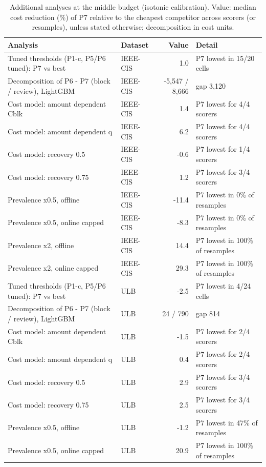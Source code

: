 \begin{table}[t]
\centering
\caption{Additional analyses at the middle budget (isotonic calibration). Value: median cost reduction (\%) of P7 relative to the cheapest competitor across scorers (or resamples), unless stated otherwise; decomposition in cost units.}
\label{tab:robust}
\begin{tabular}{llrl}
\toprule
Analysis & Dataset & Value & Detail \\
\midrule
Tuned thresholds (P1-c, P5/P6 tuned): P7 vs best & IEEE-CIS & 1.0 & P7 lowest in 15/20 cells \\
Decomposition of P6 - P7 (block / review), LightGBM & IEEE-CIS & -5,547 / 8,666 & gap 3,120 \\
Cost model: amount dependent Cblk & IEEE-CIS & 1.4 & P7 lowest for 4/4 scorers \\
Cost model: amount dependent q & IEEE-CIS & 6.2 & P7 lowest for 4/4 scorers \\
Cost model: recovery 0.5 & IEEE-CIS & -0.6 & P7 lowest for 1/4 scorers \\
Cost model: recovery 0.75 & IEEE-CIS & 1.2 & P7 lowest for 3/4 scorers \\
Prevalence x0.5, offline & IEEE-CIS & -11.4 & P7 lowest in 0\% of resamples \\
Prevalence x0.5, online capped & IEEE-CIS & -8.3 & P7 lowest in 0\% of resamples \\
Prevalence x2, offline & IEEE-CIS & 14.4 & P7 lowest in 100\% of resamples \\
Prevalence x2, online capped & IEEE-CIS & 29.3 & P7 lowest in 100\% of resamples \\
Tuned thresholds (P1-c, P5/P6 tuned): P7 vs best & ULB & -2.5 & P7 lowest in 4/24 cells \\
Decomposition of P6 - P7 (block / review), LightGBM & ULB & 24 / 790 & gap 814 \\
Cost model: amount dependent Cblk & ULB & -1.5 & P7 lowest for 2/4 scorers \\
Cost model: amount dependent q & ULB & 0.4 & P7 lowest for 2/4 scorers \\
Cost model: recovery 0.5 & ULB & 2.9 & P7 lowest for 3/4 scorers \\
Cost model: recovery 0.75 & ULB & 2.5 & P7 lowest for 3/4 scorers \\
Prevalence x0.5, offline & ULB & -1.2 & P7 lowest in 47\% of resamples \\
Prevalence x0.5, online capped & ULB & 20.9 & P7 lowest in 100\% of resamples \\

\end{tabular}
\end{table}
